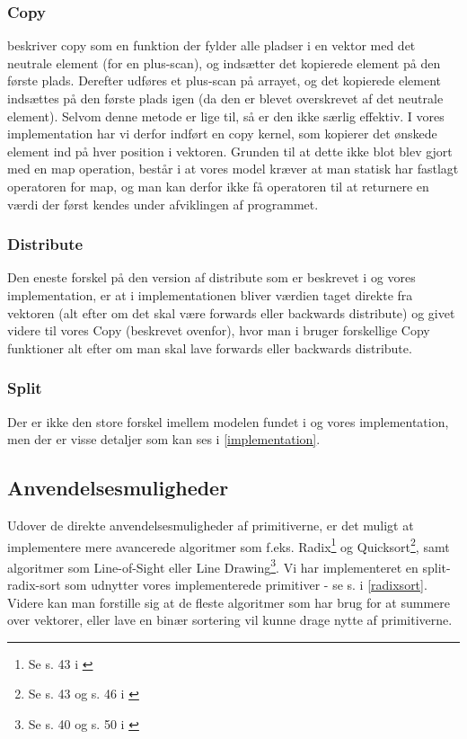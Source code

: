 \subsubsection{Copy}
\cite{ble} beskriver copy som en funktion der fylder alle pladser i en vektor med det neutrale element (for en plus-scan), og indsætter det kopierede element på den første plads. Derefter udføres et plus-scan på arrayet, og det kopierede element indsættes på den første plads igen (da den er blevet overskrevet af det neutrale element).  Selvom denne metode er lige til, så er den ikke særlig effektiv. I vores implementation har vi derfor indført en copy kernel, som kopierer det ønskede element ind på hver position i vektoren. Grunden til at dette ikke blot blev gjort med en map operation, består i at vores model kræver at man statisk har fastlagt operatoren for map, og man kan derfor ikke få operatoren til at returnere en værdi der først kendes under afviklingen af programmet.

\subsubsection{Distribute}
Den eneste forskel på den version af distribute som er beskrevet i \cite{ble} og vores implementation, er at i implementationen bliver værdien taget direkte fra vektoren (alt efter om det skal være forwards eller backwards distribute) og givet videre til vores Copy (beskrevet ovenfor), hvor man i \cite{ble} bruger forskellige Copy funktioner alt efter om man skal lave forwards eller backwards distribute.

\subsubsection{Split}
Der er ikke den store forskel imellem modelen fundet i \cite{ble} og vores implementation, men der er visse detaljer som kan ses i \ref{implementation}.

\subsection{Anvendelsesmuligheder}
Udover de direkte anvendelsesmuligheder af primitiverne, er det muligt at implementere mere avancerede algoritmer som f.eks. Radix\footnote{Se s. 43 i \cite{ble}} og Quicksort\footnote{Se s. 43 og s. 46 i \cite{ble}}, samt algoritmer som Line-of-Sight eller Line Drawing\footnote{Se s. 40 og s. 50 i \cite{ble}}. Vi har implementeret en split-radix-sort som udnytter vores implementerede primitiver - se s. \pageref{radixsort} i \ref{radixsort}. Videre kan man forstille sig at de fleste algoritmer som har brug for at summere over vektorer, eller lave en binær sortering vil kunne drage nytte af primitiverne.

